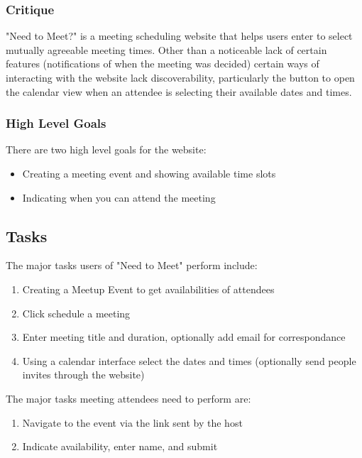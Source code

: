 \documentclass{sigchi}
\begin{document}
\subsubsection{Critique}
"Need to Meet?" is a meeting scheduling website that helps users
enter to select mutually agreeable meeting times. Other than a noticeable 
lack of certain features (notifications of when the meeting was decided)
certain ways of interacting with the website lack discoverability, particularly
the button to open the calendar view when an attendee is selecting their available
dates and times.
\subsubsection{High Level Goals}
There are two high level goals for the website:
\begin{itemize}
	\item Creating a meeting event and showing available time slots
	\item Indicating when you can attend the meeting
\end{itemize}
\subsection{Tasks}
The major tasks users of "Need to Meet" perform include: 
\begin{enumerate}
\item Creating a Meetup Event to get availabilities of attendees
\item Click schedule a meeting
\item Enter meeting title and duration, optionally add email for correspondance
\item Using a calendar interface select the dates and times (optionally 
send people invites through the website)
\end{enumerate}
The major tasks meeting attendees need to perform are: 
\begin{enumerate}
\item Navigate to the event via the link sent by the host
\item Indicate availability, enter name, and submit
\end{enumerate}
\FloatBarrier
\end{document}
